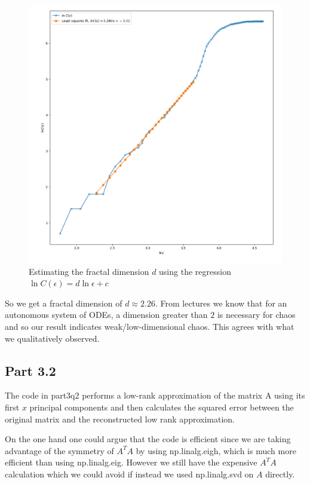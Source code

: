 \documentclass[a4paper, oneside]{book}
\begin{document}
\begin{figure}[htpb]
    \centering
    \includegraphics[width=1.0\textwidth]{./images/corr_sum.png}
    \caption{Estimating the fractal dimension $d$ using the regression  $\ln C(\epsilon) = d \ln \epsilon + c$}
\end{figure}

So we get a fractal dimension of $d \approx 2.26$. From lectures we know that for an autonomous system of ODEs, a dimension greater than $2$ is necessary for chaos and so our result
indicates weak/low-dimensional chaos. This agrees with what we qualitatively observed.


\subsection*{Part 3.2}
The code in part3q2 performs a low-rank approximation of the matrix A using its first $x$ principal components and then calculates the squared error between the original matrix and the reconstructed low rank approximation.

On the one hand one could argue that the code is efficient since we are taking advantage of the symmetry
of $A^T A$ by using np.linalg.eigh, which is much more efficient than using np.linalg.eig. However
we still have the expensive $A^T A$ calculation which we could avoid if instead we used np.linalg.svd
on $A$ directly.


\end{document}

